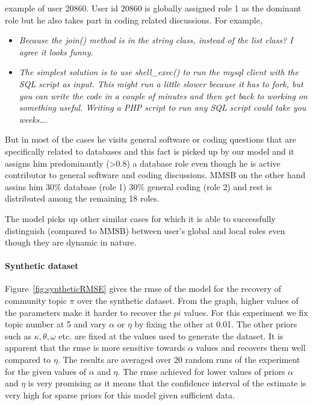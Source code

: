 \documentclass{sig-alternate}
\newcommand{\comment}[1]{\textcolor{red}{[#1]}}
\begin{document}
example of user 20860. User id 20860 is globally assigned role 1 as the dominant
role but he also takes part in coding related discussions. For example, 
\begin{itemize}
  \item \textit{Because the join() method is in 
the string class, instead of the list class?
I agree it looks funny.}  
\item \textit{The simplest solution is to use
shell\_exec() to run the mysql client with the SQL script as input. 
This might run a little slower because it has to fork, but you can write 
the code in a couple of minutes and then get back to working on something useful. 
Writing a PHP script to run any SQL script could take you weeks\ldots.}

\end{itemize}

But in most of the cases he visits general software or coding questions
that are specifically related to databases and this fact is picked up by our
model and it assigns him predominantly (>0.8) a database role even though he 
is active contributor to
general software and coding discussions. MMSB on the other hand assins him 30\%
database (role 1) 30\% general coding (role 2) and rest is distributed among the
remaining 18 roles.

The model picks up other similar cases for which it is able
to successfully distinguish (compared to MMSB) between user's global and local
roles even though they are dynamic in nature.


\paragraph{Synthetic dataset}
Figure~\ref{fig:syntheticRMSE} gives the rmse of the model for the recovery of
community topic $\pi$ over the synthetic dataset. From the graph, higher values
of the parameters make it harder to recover the $pi$ values. For this experiment
we fix topic number at 5 and vary $\alpha$ or $\eta$ by fixing the other at
0.01. The other priors such as $\kappa, \theta,
\omega$ etc. are fixed at the values used to generate the dataset.  
It is apparent that the rmse is more sensitive towards $\alpha$ values and
recovers them well compared to $\eta$. The results are averaged over 20 random
runs of the experiment for the given values of $\alpha$ and $\eta$. The rmse
achieved for lower values of priors $\alpha$ and $\eta$ is very promising as
it means that the confidence interval of the estimate is very high for sparse
priors for this model given sufficient data. 
\end{document}
